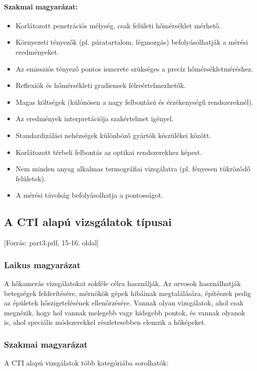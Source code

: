 \documentclass[a4paper,12pt]{article}
\begin{document}
\paragraph{Szakmai magyarázat:} \begin{itemize} \item Korlátozott penetrációs mélység, csak felületi hőmérséklet mérhető. \item Környezeti tényezők (pl. páratartalom, légmozgás) befolyásolhatják a mérési eredményeket. \item Az emissziós tényező pontos ismerete szükséges a precíz hőmérsékletméréshez. \item Reflexiók és hőmérsékleti gradiensek félreértelmezhetők. \item Magas költségek (különösen a nagy felbontású és érzékenységű rendszereknél). \item Az eredmények interpretációja szakértelmet igényel. \item Standardizálási nehézségek különböző gyártók készülékei között. \item Korlátozott térbeli felbontás az optikai rendszerekhez képest. \item Nem minden anyag alkalmas termográfiai vizsgálatra (pl. fényesen tükröződő felületek). \item A mérési távolság befolyásolhatja a pontosságot. \end{itemize}

\subsection{A CTI alapú vizsgálatok típusai} [Forrás: part3.pdf, 15-16. oldal]

\subsubsection{Laikus magyarázat} A hőkamerás vizsgálatokat sokféle célra használják. Az orvosok használhatják betegségek felderítésére, mérnökök gépek hibáinak megtalálására, építészek pedig az épületek hőszigetelésének ellenőrzésére. Vannak olyan vizsgálatok, ahol csak megnézik, hogy hol vannak melegebb vagy hidegebb pontok, és vannak olyanok is, ahol speciális módszerekkel részletesebben elemzik a hőképeket.

\subsubsection{Szakmai magyarázat} A CTI alapú vizsgálatok több kategóriába sorolhatók:
\end{document}

